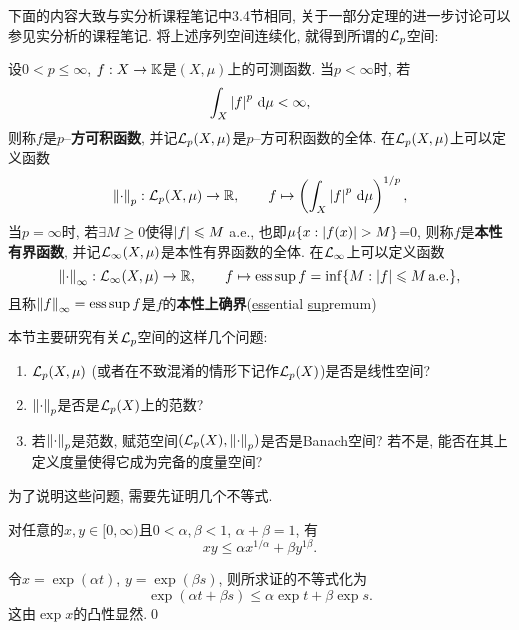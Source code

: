     下面的内容大致与实分析课程笔记中3.4节相同, 关于一部分定理的进一步讨论可以参见实分析的课程笔记. 将上述序列空间连续化, 就得到所谓的$ \CL_p $空间:

    \begin{Definition}[$ \CL_p $空间]\label{def:Lp空间}
        设$ 0<p\leqslant\infty $, $ f : X\to\mathbb{K} $是$ (X,\mu) $上的可测函数. 当$ p<\infty $时, 若
        \[
        \int_X\left| f \right| ^p\,\mathrm{d}\mu<\infty,
        \]
        则称$ f $是$ p $--\textbf{方可积函数}, 并记$ \mathcal{L}_p(X,\mu) $是$ p $--方可积函数的全体. 在$ \mathcal{L}_p(X,\mu) $上可以定义函数
        \[
        \left\| \cdot \right\|_p : \mathcal{L}_p(X,\mu)\to\mathbb{R},\qquad f\mapsto\left(\int_X\left| f \right| ^p\,\mathrm{d}\mu\right)^{1/p},
        \]
        当$ p=\infty $时, 若$ \exists M\geqslant 0 $使得$ \left| f \right| \leqslant M $ a.e., 也即$ \mu\{ x : \left| f(x) \right| >M \} $=0, 则称$ f $是\textbf{本性有界函数}, 并记$ \mathcal{L}_\infty(X,\mu) $是本性有界函数的全体. 在$ \mathcal{L}_\infty $上可以定义函数
        \[
        \left\| \cdot \right\|_\infty : \mathcal{L}_\infty(X,\mu)\to\mathbb{R},\qquad f\mapsto\operatorname{ess\,sup} f=\inf\{ M : \left| f \right| \leqslant M \text{\,a.e.} \},
        \]
        且称$ \left\| f \right\|_\infty=\operatorname{ess\,sup} f $是$ f $的\textbf{本性上确界}(\underline{ess}ential \underline{sup}remum)
    \end{Definition}

    本节主要研究有关$ \CL_p $空间的这样几个问题:
    \begin{enumerate}[(1)]
    \item $ \mathcal{L}_p(X,\mu) $ (或者在不致混淆的情形下记作$ \mathcal{L}_p(X) $)是否是线性空间?\label{item:1.7节主要问题1}
    \item $ \left\| \cdot \right\|_p $是否是$ \mathcal{L}_p(X) $上的范数?\label{item:1.7节主要问题2}
    \item 若$ \left\| \cdot \right\|_p $是范数, 赋范空间$ (\mathcal{L}_p(X),\left\| \cdot \right\|_p) $是否是Banach空间? 若不是, 能否在其上定义度量使得它成为完备的度量空间?\label{item:1.7节主要问题3}
    \end{enumerate}
    为了说明这些问题, 需要先证明几个不等式.

    \begin{Lemma}[Young]
    对任意的$ x, y\in[0,\infty) $且$ 0<\alpha,\beta<1 $, $ \alpha+\beta=1 $, 有
    \[
    xy\leqslant \alpha x^{1/\alpha}+\beta y^{1\beta}.
    \]
    \end{Lemma}
    \begin{Proof}
    令$ x=\exp(\alpha t) $, $ y=\exp(\beta s) $, 则所求证的不等式化为
    \[
    \exp(\alpha t+\beta s)\leqslant\alpha\exp t+\beta\exp s.
    \]
    这由$ \exp x $的凸性显然.\qed
    \end{Proof}

